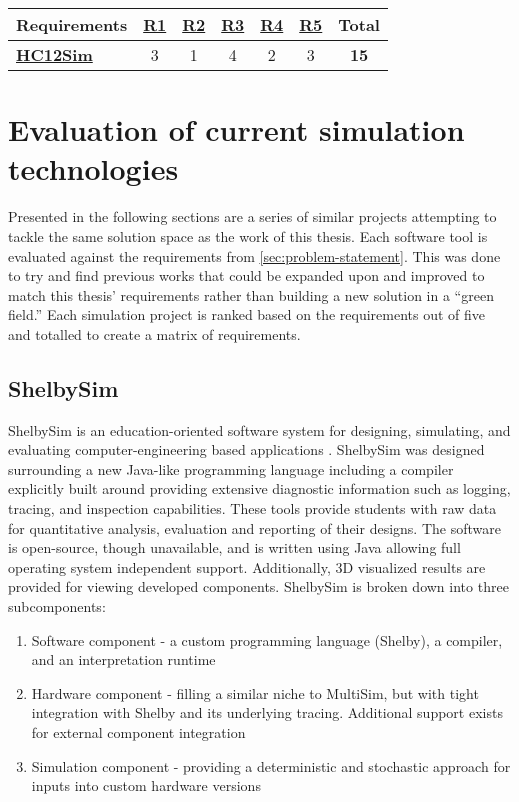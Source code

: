 \begin{table}[h!]
    \centering
    \begin{tabular}{l|cccccc}
        \textbf{Requirements} & \textbf{\hyperref[req:personal]{R1}} & \textbf{\hyperref[req:configuration]{R2}} & \textbf{\hyperref[req:pedagogical]{R3}} & \textbf{\hyperref[req:simulations]{R4}} & \textbf{\hyperref[req:modern]{R5}} & \textbf{Total} \\ \hline
        \textbf{\hyperref[sec:review-prev-hc12sim]{HC12Sim} \cite{Brightwell2013}} 
        & 3 & 1 & 4 & 2 & 3 & \textbf{15} \\
    \end{tabular}
\end{table}

\section{Evaluation of current simulation technologies} 
\label{sec:review}

Presented in the following sections are a series of similar projects attempting to tackle the same solution space as the work of this thesis. Each software tool is evaluated against the requirements from \cref{sec:problem-statement}. This was done to try and find previous works that could be expanded upon and improved to match this thesis' requirements rather than building a new solution in a ``green field.'' Each simulation project is ranked based on the requirements out of five and totalled to create a matrix of requirements.

\subsection{ShelbySim}
\label{sec:review-shelbysim}

ShelbySim is an education-oriented software system for designing, simulating, and evaluating computer-engineering based applications \cite{Tappan2009, Tappan2009-2}. ShelbySim was designed surrounding a new Java-like programming language including a compiler explicitly built around providing extensive diagnostic information such as logging, tracing, and inspection capabilities. These tools provide students with raw data for quantitative analysis, evaluation and reporting of their designs. The software is open-source, though unavailable, and is written using Java allowing full operating system independent support. Additionally, 3D visualized results are provided for viewing developed components. ShelbySim is broken down into three subcomponents:
\begin{enumerate}
    \item Software component - a custom programming language (Shelby), a compiler, and an interpretation runtime
    \item Hardware component - filling a similar niche to MultiSim, but with tight integration with Shelby and its underlying tracing. Additional support exists for external component integration
    \item Simulation component - providing a deterministic and stochastic approach for inputs into custom hardware versions
\end{enumerate} 

